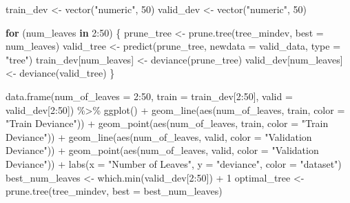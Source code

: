 \documentclass[
]{article}
\newenvironment{Shaded}{\begin{snugshade}}{\end{snugshade}}
\newcommand{\AttributeTok}[1]{\textcolor[rgb]{0.77,0.63,0.00}{#1}}
\newcommand{\ControlFlowTok}[1]{\textcolor[rgb]{0.13,0.29,0.53}{\textbf{#1}}}
\newcommand{\DecValTok}[1]{\textcolor[rgb]{0.00,0.00,0.81}{#1}}
\newcommand{\FunctionTok}[1]{\textcolor[rgb]{0.00,0.00,0.00}{#1}}
\newcommand{\NormalTok}[1]{#1}
\newcommand{\OtherTok}[1]{\textcolor[rgb]{0.56,0.35,0.01}{#1}}
\newcommand{\SpecialCharTok}[1]{\textcolor[rgb]{0.00,0.00,0.00}{#1}}
\newcommand{\StringTok}[1]{\textcolor[rgb]{0.31,0.60,0.02}{#1}}
\begin{document}
\begin{Shaded}
\begin{Highlighting}[]
\NormalTok{train\_dev }\OtherTok{\textless{}{-}} \FunctionTok{vector}\NormalTok{(}\StringTok{"numeric"}\NormalTok{, }\DecValTok{50}\NormalTok{)}
\NormalTok{valid\_dev }\OtherTok{\textless{}{-}} \FunctionTok{vector}\NormalTok{(}\StringTok{"numeric"}\NormalTok{, }\DecValTok{50}\NormalTok{)}

\ControlFlowTok{for}\NormalTok{ (num\_leaves }\ControlFlowTok{in} \DecValTok{2}\SpecialCharTok{:}\DecValTok{50}\NormalTok{) \{}
\NormalTok{    prune\_tree }\OtherTok{\textless{}{-}} \FunctionTok{prune.tree}\NormalTok{(tree\_mindev, }\AttributeTok{best =}\NormalTok{ num\_leaves)}
\NormalTok{    valid\_tree }\OtherTok{\textless{}{-}} \FunctionTok{predict}\NormalTok{(prune\_tree, }\AttributeTok{newdata =}\NormalTok{ valid\_data,}
        \AttributeTok{type =} \StringTok{"tree"}\NormalTok{)}
\NormalTok{    train\_dev[num\_leaves] }\OtherTok{\textless{}{-}} \FunctionTok{deviance}\NormalTok{(prune\_tree)}
\NormalTok{    valid\_dev[num\_leaves] }\OtherTok{\textless{}{-}} \FunctionTok{deviance}\NormalTok{(valid\_tree)}
\NormalTok{\}}

\FunctionTok{data.frame}\NormalTok{(}\AttributeTok{num\_of\_leaves =} \DecValTok{2}\SpecialCharTok{:}\DecValTok{50}\NormalTok{, }\AttributeTok{train =}\NormalTok{ train\_dev[}\DecValTok{2}\SpecialCharTok{:}\DecValTok{50}\NormalTok{],}
    \AttributeTok{valid =}\NormalTok{ valid\_dev[}\DecValTok{2}\SpecialCharTok{:}\DecValTok{50}\NormalTok{]) }\SpecialCharTok{\%\textgreater{}\%}
    \FunctionTok{ggplot}\NormalTok{() }\SpecialCharTok{+} \FunctionTok{geom\_line}\NormalTok{(}\FunctionTok{aes}\NormalTok{(num\_of\_leaves, train, }\AttributeTok{color =} \StringTok{"Train Deviance"}\NormalTok{)) }\SpecialCharTok{+}
    \FunctionTok{geom\_point}\NormalTok{(}\FunctionTok{aes}\NormalTok{(num\_of\_leaves, train, }\AttributeTok{color =} \StringTok{"Train Deviance"}\NormalTok{)) }\SpecialCharTok{+}
    \FunctionTok{geom\_line}\NormalTok{(}\FunctionTok{aes}\NormalTok{(num\_of\_leaves, valid, }\AttributeTok{color =} \StringTok{"Validation Deviance"}\NormalTok{)) }\SpecialCharTok{+}
    \FunctionTok{geom\_point}\NormalTok{(}\FunctionTok{aes}\NormalTok{(num\_of\_leaves, valid, }\AttributeTok{color =} \StringTok{"Validation Deviance"}\NormalTok{)) }\SpecialCharTok{+}
    \FunctionTok{labs}\NormalTok{(}\AttributeTok{x =} \StringTok{"Number of Leaves"}\NormalTok{, }\AttributeTok{y =} \StringTok{"deviance"}\NormalTok{, }\AttributeTok{color =} \StringTok{"dataset"}\NormalTok{)}
\NormalTok{best\_num\_leaves }\OtherTok{\textless{}{-}} \FunctionTok{which.min}\NormalTok{(valid\_dev[}\DecValTok{2}\SpecialCharTok{:}\DecValTok{50}\NormalTok{]) }\SpecialCharTok{+} \DecValTok{1}
\NormalTok{optimal\_tree }\OtherTok{\textless{}{-}} \FunctionTok{prune.tree}\NormalTok{(tree\_mindev, }\AttributeTok{best =}\NormalTok{ best\_num\_leaves)}


\end{Highlighting}
\end{Shaded}
\end{document}
